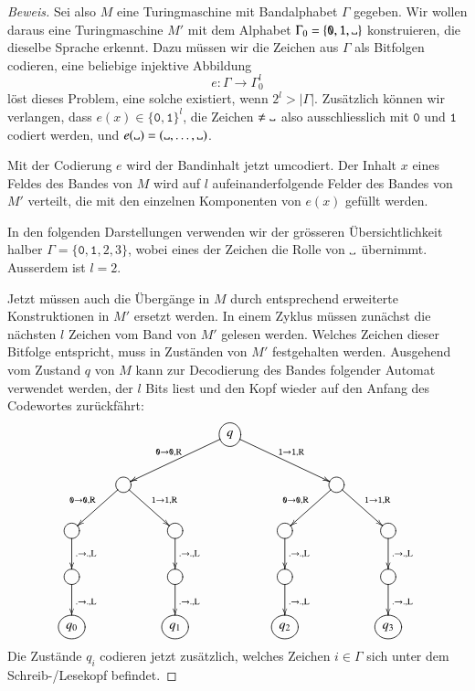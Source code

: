 \begin{proof}[Beweis]
Sei also $M$ eine Turingmaschine mit Bandalphabet $\Gamma$ gegeben. Wir
wollen daraus eine Turingmaschine $M'$ mit dem Alphabet
$\Gamma_0= \{\texttt{0},\texttt{1},\blank\}$ konstruieren, die dieselbe
Sprache erkennt. Dazu müssen wir die Zeichen aus $\Gamma$ als
Bitfolgen codieren, eine beliebige injektive Abbildung
\[
e\colon\Gamma\to \Gamma_0^l
\]
löst dieses Problem, eine solche existiert, wenn $2^l>|\Gamma|$.
Zusätzlich können
wir verlangen, dass $e(x)\in \{\texttt{0},\texttt{1}\}^l$, die Zeichen $\ne\blank$
also ausschliesslich mit $\texttt{0}$ und $\texttt{1}$ codiert werden, und
$e(\blank)=(\blank,\dots,\blank)$.

Mit der Codierung $e$ wird der Bandinhalt jetzt umcodiert. Der Inhalt
$x$
eines Feldes des Bandes von $M$ wird auf $l$ aufeinanderfolgende Felder
des Bandes von $M'$ verteilt, die mit den einzelnen Komponenten
von $e(x)$ gefüllt werden.

In den folgenden Darstellungen verwenden wir der grösseren
Übersichtlichkeit halber $\Gamma=\{\texttt{0},\texttt{1},2,3\}$, wobei eines der
Zeichen die Rolle von $\blank$ übernimmt. Ausserdem ist $l=2$.

Jetzt müssen auch die Übergänge in $M$
durch entsprechend erweiterte Konstruktionen in $M'$ ersetzt werden.
In einem Zyklus müssen zunächst die nächsten $l$ Zeichen vom Band
von $M'$ gelesen werden. Welches Zeichen dieser Bitfolge entspricht,
muss in Zuständen von $M'$ festgehalten werden. Ausgehend vom Zustand
$q$ von $M$ kann zur Decodierung
des Bandes folgender Automat verwendet werden, der $l$ Bits liest
und den Kopf wieder auf den Anfang des Codewortes zurückfährt:
\[
\entrymodifiers={++[o][F]}
\xymatrix{
*+\txt{}
	&*+\txt{}
		&*+\txt{}
			&q\ar[dll]_{\texttt{0}\to \texttt{0},\text{R}} \ar[drr]^{\texttt{1}\to \texttt{1},\text{R}}
\\
*+\txt{}
	&\ar[dl]_{\texttt{0}\to \texttt{0},\text{R}} \ar[dr]^{\texttt{1}\to \texttt{1},\text{R}}
		&*+\txt{}
			&*+\txt{}
				&*+\txt{}
					&\ar[dl]_{\texttt{0}\to \texttt{0},\text{R}} \ar[dr]^{\texttt{1}\to \texttt{1},\text{R}}
						&*+\txt{}
\\
\ar[d]^{.\to .,\text{L}}
	&*+\txt{}
		&\ar[d]^{.\to .,\text{L}}
			&*+\txt{}
				&\ar[d]^{.\to .,\text{L}}
					&*+\txt{}
						&\ar[d]^{.\to .,\text{L}}
\\
\ar[d]^{.\to .,\text{L}}
	&*+\txt{}
		&\ar[d]^{.\to .,\text{L}}
			&*+\txt{}
				&\ar[d]^{.\to .,\text{L}}
					&*+\txt{}
						&\ar[d]^{.\to .,\text{L}}
\\
q_0
	&*+\txt{}
		&q_1
			&*+\txt{}
				&q_2
					&*+\txt{}
						&q_3
}
\]
Die Zustände $q_i$ codieren jetzt zusätzlich, welches
Zeichen $i\in\Gamma$ sich unter dem Schreib-/Lesekopf befindet.


\end{proof}
